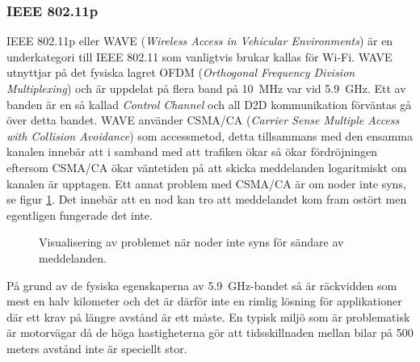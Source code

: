 \documentclass[a4paper]{IEEEtran}
\begin{document}
\subsubsection{IEEE 802.11p}
IEEE 802.11p eller WAVE (\emph{Wireless Access in Vehicular Environments}) är en underkategori till IEEE 802.11 som vanligtvis brukar kallas för Wi-Fi. 
WAVE utnyttjar på det fysiska lagret OFDM (\emph{Orthogonal Frequency Division Multiplexing}) och är uppdelat på flera band på 10~MHz var vid 5.9~GHz. 
Ett av banden är en så kallad \emph{Control Channel} och all D2D kommunikation förväntas gå över detta bandet. 
WAVE använder CSMA/CA (\emph{Carrier Sense Multiple Access with Collision Avoidance}) som accessmetod, detta tillsammans med den ensamma kanalen innebär att i samband med att trafiken ökar så ökar fördröjningen eftersom CSMA/CA ökar väntetiden på att skicka meddelanden logaritmiskt om kanalen är upptagen.
Ett annat problem med CSMA/CA är om noder inte syns, se figur \ref{Img:HiddenNode}. %
Det innebär att en nod kan tro att meddelandet kom fram ostört men egentligen fungerade det inte.

\begin{figure}
	\begin{center}
	\end{center}
	\caption{Visualisering av problemet när noder inte syns för sändare av meddelanden.}
	\label{Img:HiddenNode}
\end{figure}

På grund av de fysiska egenskaperna av 5.9~GHz-bandet så är räckvidden som mest en halv kilometer och det är därför inte en rimlig lösning för applikationer där ett krav på längre avstånd är ett måste. 
En typisk miljö som är problematisk är motorvägar då de höga hastigheterna gör att tidsskillnaden mellan bilar på 500 meters avstånd inte är speciellt stor. \cite{5GPPP}
\end{document}
